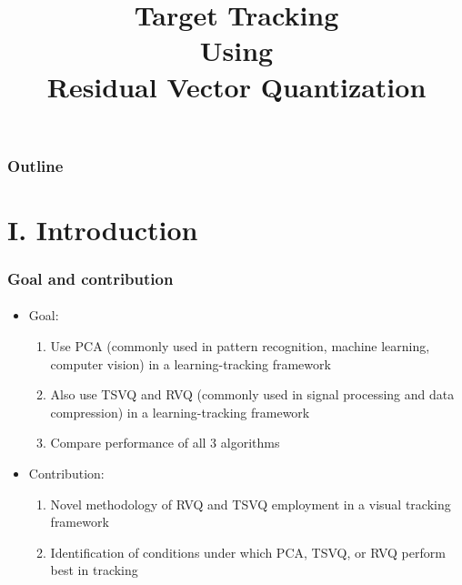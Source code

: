 

\title{Target Tracking \\ Using \\Residual Vector Quantization}
\begin{frame}[plain]\logoCSIPCPL\logoTechTower
	\titlepage
\end{frame}

\begin{frame}
\frametitle{Outline}
\logoCSIPCPL\logoTechTower
	\setcounter{tocdepth}{1}	
	\tableofcontents
\end{frame}

\section{I. Introduction}
\begin{frame}
\frametitle{Goal and contribution}
\framesubtitle{}
\logoCSIPCPL\mypagenum
\begin{itemize}
\item Goal: 
\begin{enumerate}
\item Use PCA (commonly used in pattern recognition, machine learning, computer vision) in a learning-tracking framework
\item Also use TSVQ and RVQ (commonly used in signal processing and data compression) in a learning-tracking framework 
\item Compare performance of all 3 algorithms
\end{enumerate}
\vspace{0.2in}
\item Contribution:
\begin{enumerate}
\item Novel methodology of RVQ and TSVQ employment in a visual tracking framework
\item Identification of conditions under which PCA, TSVQ, or RVQ perform best in tracking
\end{enumerate}
\end{itemize}
\end{frame}


